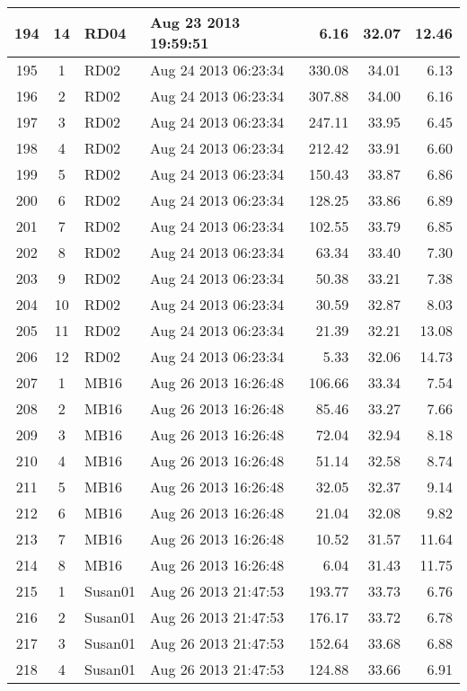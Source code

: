 \documentclass{article}
\begin{document}
\begin{longtable}{ccllrrr}
194 & 14 & RD04 & Aug 23 2013 19:59:51 & 6.16 & 32.07 & 12.46 \\
\hline
195 & 1 & RD02 & Aug 24 2013 06:23:34 & 330.08 & 34.01 & 6.13 \\
196 & 2 & RD02 & Aug 24 2013 06:23:34 & 307.88 & 34.00 & 6.16 \\
197 & 3 & RD02 & Aug 24 2013 06:23:34 & 247.11 & 33.95 & 6.45 \\
198 & 4 & RD02 & Aug 24 2013 06:23:34 & 212.42 & 33.91 & 6.60 \\
199 & 5 & RD02 & Aug 24 2013 06:23:34 & 150.43 & 33.87 & 6.86 \\
200 & 6 & RD02 & Aug 24 2013 06:23:34 & 128.25 & 33.86 & 6.89 \\
201 & 7 & RD02 & Aug 24 2013 06:23:34 & 102.55 & 33.79 & 6.85 \\
202 & 8 & RD02 & Aug 24 2013 06:23:34 & 63.34 & 33.40 & 7.30 \\
203 & 9 & RD02 & Aug 24 2013 06:23:34 & 50.38 & 33.21 & 7.38 \\
204 & 10 & RD02 & Aug 24 2013 06:23:34 & 30.59 & 32.87 & 8.03 \\
205 & 11 & RD02 & Aug 24 2013 06:23:34 & 21.39 & 32.21 & 13.08 \\
206 & 12 & RD02 & Aug 24 2013 06:23:34 & 5.33 & 32.06 & 14.73 \\
\hline
207 & 1 & MB16 & Aug 26 2013 16:26:48 & 106.66 & 33.34 & 7.54 \\
208 & 2 & MB16 & Aug 26 2013 16:26:48 & 85.46 & 33.27 & 7.66 \\
209 & 3 & MB16 & Aug 26 2013 16:26:48 & 72.04 & 32.94 & 8.18 \\
210 & 4 & MB16 & Aug 26 2013 16:26:48 & 51.14 & 32.58 & 8.74 \\
211 & 5 & MB16 & Aug 26 2013 16:26:48 & 32.05 & 32.37 & 9.14 \\
212 & 6 & MB16 & Aug 26 2013 16:26:48 & 21.04 & 32.08 & 9.82 \\
213 & 7 & MB16 & Aug 26 2013 16:26:48 & 10.52 & 31.57 & 11.64 \\
214 & 8 & MB16 & Aug 26 2013 16:26:48 & 6.04 & 31.43 & 11.75 \\
\hline
215 & 1 & Susan01 & Aug 26 2013 21:47:53 & 193.77 & 33.73 & 6.76 \\
216 & 2 & Susan01 & Aug 26 2013 21:47:53 & 176.17 & 33.72 & 6.78 \\
217 & 3 & Susan01 & Aug 26 2013 21:47:53 & 152.64 & 33.68 & 6.88 \\
218 & 4 & Susan01 & Aug 26 2013 21:47:53 & 124.88 & 33.66 & 6.91 \\

\end{longtable}
\end{document}
